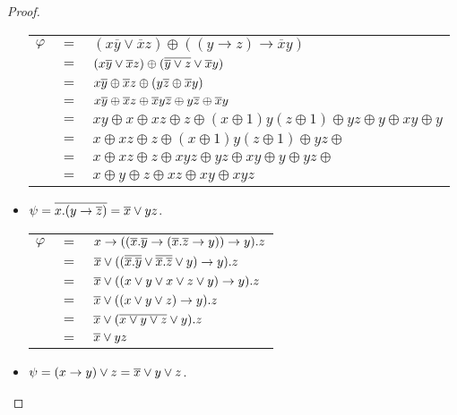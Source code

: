 \begin{proof}
\begin{itemize}
    \begin{tabular}{l c l}
      $\varphi$ & $=$ & $(x\overline{y}\vee \overline{x}z)\oplus ((y\rightarrow z)\rightarrow \overline{x}y)$\\
      & $=$ & $(x\overline{y}\vee \overline{x}z) \oplus (\overline{\overline{y}\vee z} \vee \overline{x}y)$ \\
      & $=$ & $x\overline{y}\oplus \overline{x}z \oplus (y\overline{z} \oplus \overline{x}y)$ \\
      & $=$ & $x\overline{y}\oplus \overline{x}z\oplus \overline{x}y\overline{z} \oplus y\overline{z} \oplus \overline{x}y$ \\
      & $=$ & $xy \oplus x \oplus xz \oplus z \oplus (x\oplus 1)y(z\oplus 1) \oplus yz\oplus y \oplus xy \oplus y$ \\
      & $=$ & $x \oplus xz \oplus z \oplus (x\oplus 1)y(z\oplus 1) \oplus yz\oplus $ \\
      & $=$ & $x \oplus xz \oplus z \oplus xyz \oplus yz \oplus xy \oplus y \oplus yz\oplus $ \\
      & $=$ & $x \oplus y\oplus z \oplus xz \oplus xy \oplus xyz$ \\
     \end{tabular}
     
   \item
     $\psi = \overline{x.(y\rightarrow\overline{z})} = \overline{x}\vee yz$.
     
     \begin{tabular}{l c l}
       $\varphi$ & $ = $ & $x\rightarrow ((\overline{x}.\overline{y}\rightarrow(\overline{x}.\overline{z}\rightarrow y))\rightarrow y).z$\\
       & $=$ & $\overline{x} \vee ((\overline{\overline{x}.\overline{y}} \vee \overline{\overline{x}.\overline{z}}\vee y)\rightarrow y).z$\\
       & $=$ & $\overline{x} \vee ((x\vee y \vee x\vee z \vee y)\rightarrow y).z$\\
       & $=$ & $\overline{x} \vee ((x\vee y \vee z)\rightarrow y).z$\\
       & $=$ & $\overline{x} \vee (\overline{x\vee y \vee z}\vee y).z$\\
       & $=$ & $\overline{x} \vee yz$
     \end{tabular}

     
  \item
    $\psi = (x\rightarrow y)\vee z = \overline{x}\vee y \vee z$.
    

\end{itemize}
\end{proof}
